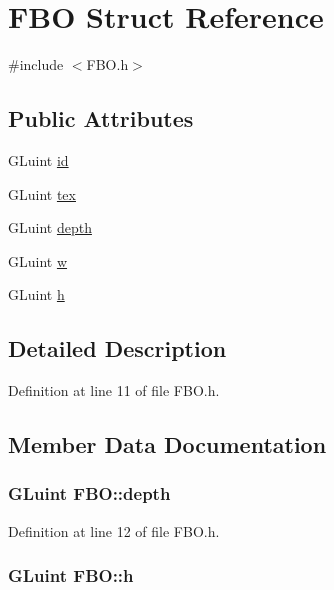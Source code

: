 \hypertarget{struct_f_b_o}{\section{F\-B\-O Struct Reference}
\label{struct_f_b_o}
}


{\ttfamily \#include $<$F\-B\-O.\-h$>$}

\subsection*{Public Attributes}
\begin{DoxyCompactItemize}
\item 
G\-Luint \hyperlink{struct_f_b_o_ab7aa75fe72b55be89b7307d81fc67948}{id}
\item 
G\-Luint \hyperlink{struct_f_b_o_aab7ef65db84f895bcc55033dcab8ce47}{tex}
\item 
G\-Luint \hyperlink{struct_f_b_o_ad269b6175f0a3ad919e11c406d56933a}{depth}
\item 
G\-Luint \hyperlink{struct_f_b_o_a49e0b8cf91b4177c5e9e2868dd492a09}{w}
\item 
G\-Luint \hyperlink{struct_f_b_o_a7fe7d37c84da3fa17439062a13f80574}{h}
\end{DoxyCompactItemize}


\subsection{Detailed Description}


Definition at line 11 of file F\-B\-O.\-h.



\subsection{Member Data Documentation}
\hypertarget{struct_f_b_o_ad269b6175f0a3ad919e11c406d56933a}{
\subsubsection[{depth}]{\setlength{\rightskip}{0pt plus 5cm}G\-Luint F\-B\-O\-::depth}}\label{struct_f_b_o_ad269b6175f0a3ad919e11c406d56933a}


Definition at line 12 of file F\-B\-O.\-h.

\hypertarget{struct_f_b_o_a7fe7d37c84da3fa17439062a13f80574}{
\subsubsection[{h}]{\setlength{\rightskip}{0pt plus 5cm}G\-Luint F\-B\-O\-::h}}\label{struct_f_b_o_a7fe7d37c84da3fa17439062a13f80574}


